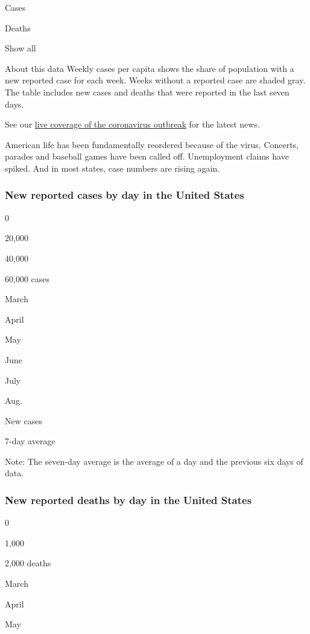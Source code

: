 Cases

Deaths

Show all

About this data Weekly cases per capita shows the share of population
with a new reported case for each week. Weeks without a reported case
are shaded gray. The table includes new cases and deaths that were
reported in the last seven days.

See our
\href{https://www.nytimes.com/2020/08/02/world/coronavirus-covid-19.html}{live
coverage of the coronavirus outbreak} for the latest news.

American life has been fundamentally reordered because of the virus.
Concerts, parades and baseball games have been called off. Unemployment
claims have spiked. And in most states, case numbers are rising again.

\hypertarget{new-reported-cases-by-day-in-the-united-states}{%
\subsubsection{New reported cases by day in the United
States}\label{new-reported-cases-by-day-in-the-united-states}}

0

20,000

40,000

60,000 cases

March

April

May

June

July

Aug.

New cases

7-day average

Note: The seven-day average is the average of a day and the previous six
days of data.

\hypertarget{new-reported-deaths-by-day-in-the-united-states}{%
\subsubsection{New reported deaths by day in the United
States}\label{new-reported-deaths-by-day-in-the-united-states}}

0

1,000

2,000 deaths

March

April

May

